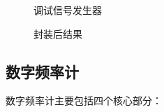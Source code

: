 \documentclass[UTF8,titlepage,a4paper]{ctexart}
\numberwithin{figure}{section}
\begin{document}
\begin{enumerate}
    \begin{figure}[H]
    \centering
     \caption{调试信号发生器}
     \label{}
    \end{figure}
    \begin{figure}[H]
    \centering
     \caption{封装后结果}
     \label{}
    \end{figure}

\end{enumerate}

\subsection{数字频率计}

数字频率计主要包括四个核心部分：
\end{document}
